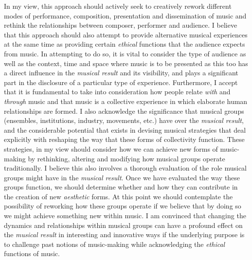 In my view, this approach should actively seek to creatively rework different modes of performance, composition, presentation and dissemination of music and rethink the relationships between composer, performer and audience. I believe that this approach should also attempt to provide alternative musical experiences at the same time as providing certain \emph{ethical} functions that the audience expects from music. In attempting to do so, it is vital to consider the type of audience as well as the context, time and space where music is to be presented as this too has a direct influence in the \emph{musical result} and its visibility, and plays a significant part in the disclosure of a particular type of experience. Furthermore, I accept that it is fundamental to take into consideration how people relate \emph{with} and \emph{through} music and that music is a collective experience in which elaborate human relationships are formed. I also acknowledge the significance that musical groups (ensembles, institutions, industry, movements, etc.) have over the \emph{musical result}, and the considerable potential that exists in devising musical strategies that deal explicitly with reshaping the way that these forms of collectivity function. These strategies, in my view should consider how we can achieve new forms of music-making by rethinking, altering and modifying how musical groups operate traditionally. I believe this also involves a thorough evaluation of the role musical groups might have in the \emph{musical result}. Once we have evaluated the way these groups function, we should determine whether and how they can contribute in the creation of new \emph{aesthetic} forms. At this point we should contemplate the possibility of reworking how these groups operate if we believe that by doing so we might achieve something new within music. I am convinced that changing the dynamics and relationships within musical groups can have a profound effect on the \emph{musical result} in interesting and innovative ways if the underlying purpose is to challenge past notions of music-making while acknowledging the \emph{ethical} functions of music. 

\indent

